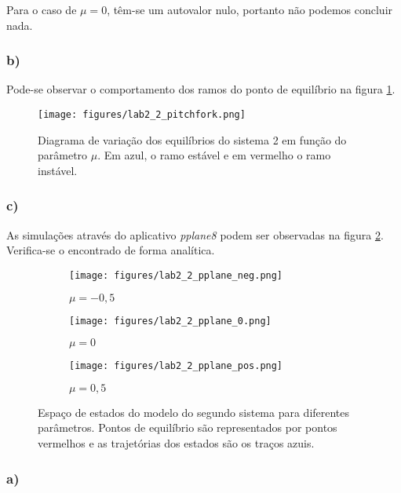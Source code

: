 \documentclass[a4paper]{report}
\begin{document}
Para o caso de $\mu=0$, têm-se um autovalor nulo, portanto não podemos concluir nada.

\subsubsection*{b)}

Pode-se observar o comportamento dos ramos do ponto de equilíbrio na figura \ref{fig:figures-lab2_2_pitchfork-png}.

\begin{figure}[H]
    \centering
    \texttt{[image: figures/lab2\_2\_pitchfork.png]}
    \caption{Diagrama de variação dos equilíbrios do sistema 2 em função do parâmetro $\mu$. Em azul, o ramo estável e em vermelho o ramo instável.}
    \label{fig:figures-lab2_2_pitchfork-png}
\end{figure}

\subsubsection*{c)}

As simulações através do aplicativo \emph{pplane8} podem ser observadas na figura \ref{fig:pplane-2}. Verifica-se o encontrado de forma analítica.

\begin{figure}[H]
    \centering
    \begin{subfigure}{0.29\textwidth}
	\texttt{[image: figures/lab2\_2\_pplane\_neg.png]}
	\caption{$\mu=-0,5$}
    \end{subfigure}
    \begin{subfigure}{0.29\textwidth}
	\texttt{[image: figures/lab2\_2\_pplane\_0.png]}
	\caption{$\mu=0$}
    \end{subfigure}
    \begin{subfigure}{0.29\textwidth}
	\texttt{[image: figures/lab2\_2\_pplane\_pos.png]}
	\caption{$\mu=0,5$}
    \end{subfigure}
    \caption{Espaço de estados do modelo do segundo sistema para diferentes parâmetros. Pontos de equilíbrio são representados por pontos vermelhos e as trajetórias dos estados são os traços azuis.}
    \label{fig:pplane-2}
\end{figure}

\exercise{}

\subsubsection*{a)}
\end{document}
